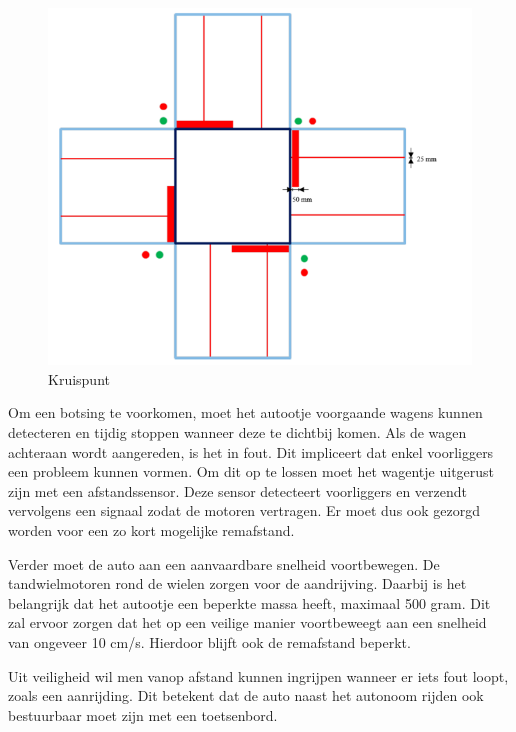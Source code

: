 \documentclass[a4paper,twoside,kulak]{kulakreport} %
\begin{document}
\begin{figure}
	\centering
	\includegraphics[width=.6\textwidth]{volglijnenEnStoplijnen}
	\caption{Kruispunt}
	\label{fig:plattegrond}
\end{figure}

Om een botsing te voorkomen, moet het autootje voorgaande wagens kunnen detecteren en tijdig stoppen wanneer deze te dichtbij komen. Als de wagen achteraan wordt aangereden, is het in fout. Dit impliceert dat enkel voorliggers een probleem kunnen vormen. Om dit op te lossen moet het wagentje uitgerust zijn met een afstandssensor. Deze sensor detecteert voorliggers en verzendt vervolgens een signaal zodat de motoren vertragen. Er moet dus ook gezorgd worden voor een zo kort mogelijke remafstand. %

Verder moet de auto aan een aanvaardbare snelheid voortbewegen. De tandwielmotoren rond de wielen zorgen voor de aandrijving. Daarbij is het belangrijk dat het autootje een beperkte massa heeft, maximaal 500 gram. Dit zal ervoor zorgen dat het op een veilige manier voortbeweegt aan een snelheid van ongeveer 10 cm/s. Hierdoor blijft ook de remafstand beperkt.

Uit veiligheid wil men vanop afstand kunnen ingrijpen wanneer er iets fout loopt, zoals een aanrijding. Dit betekent dat de auto naast het autonoom rijden ook bestuurbaar moet zijn met een toetsenbord.




\end{document}
